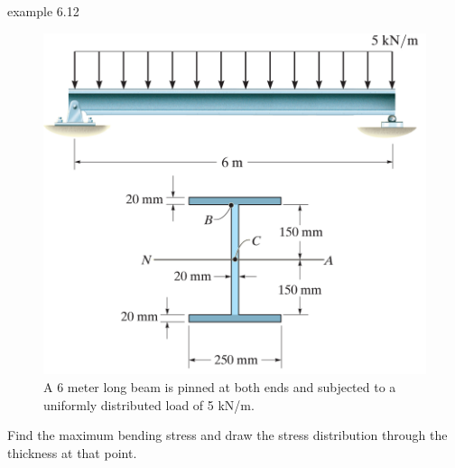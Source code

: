 \begin{frame}{example 6.12}
\protect\hypertarget{example-6.12}{}
\begin{figure}
\centering
\includegraphics{../images/example-6-12.png}
\caption{A 6 meter long beam is pinned at both ends and subjected to a
uniformly distributed load of 5 kN/m.}
\end{figure}

Find the maximum bending stress and draw the stress distribution through
the thickness at that point.
\end{frame}
